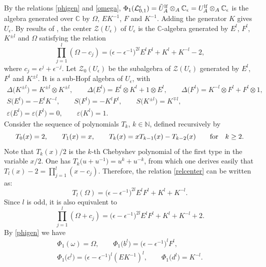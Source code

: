 \documentclass[pdftex]{sigma}%
\numberwithin{equation}{section}
\numberwithin{figure}{section}
\newcommand{\e}{\epsilon}
\newcommand{\mc}{\mathbb{C}}
\newcommand{\Ll}{{\mathcal L}}
\begin{document}
By the relations \eqref{phigen} and \eqref{omega}, $\Phi_1(\Ll_{0,1}^\e) = \tilde{U}_A^{\rm lf}\otimes_A {\mathbb C}_{\epsilon} = U_A^{\rm lf}\otimes_A {\mathbb C}_{\epsilon}$ is the algebra generated over $\mc$ by $\Omega$, $EK^{-1}$, $F$ and $K^{-1}$. Adding the generator $K$ gives $U_\epsilon$. By results of \cite{DC-K}, the center $\mathcal{Z}(U_\epsilon)$ of $U_\epsilon$ is the $\mc$-algebra generated by $E^l$, $F^l$, $K^{\pm l}$ and $\Omega$ satisfying the relation
 \begin{equation}\label{relcenter}
 \prod_{j=1}^l (\Omega- c_j) = \big(\epsilon-\epsilon^{-1}\big)^{2l}E^lF^l+K^l+K^{-l}- 2,
 \end{equation}
 where $ c_j = \epsilon^j+\epsilon^{-j}$. Let $\mathcal{Z}_0(U_\epsilon)$ be the subalgebra of $\mathcal{Z}(U_\epsilon)$ generated by $E^l$, $F^l$ and $K^{\pm l}$. It is a sub-Hopf algebra of $U_\epsilon$, with
\begin{gather*}
\Delta\big(K^{\pm l}\big)=K^{\pm l}\otimes K^{\pm l},\qquad
\Delta\big(E^l\big)=E^l\otimes K^l+1\otimes E^l,\qquad
\Delta\big(F^l\big)=K^{-l}\otimes F^l + F^l\otimes 1,
\\
S\big(E^l\big) = -E^lK^{-l},\qquad
S\big(F^l\big) = -K^lF^l,\qquad
S\big(K^{\pm l}\big) = K^{\mp l},
\\
\varepsilon\big(E^l\big) = \varepsilon\big(F^l\big)=0,\qquad
\varepsilon\big(K^l\big)=1.
\end{gather*}
Consider the sequence of polynomials $T_k$, $k\in \mathbb{N}$, defined recursively by
\begin{equation}\label{ChPol}
T_0(x)=2,\qquad
T_1(x) =x,\qquad
T_k(x) = xT_{k-1}(x)-T_{k-2}(x)\qquad
{\rm for}\quad k\geq 2.
\end{equation}
Note that $T_k(x)/2$ is the $k$-th Chebyshev polynomial of the first type in the variable $x/2$. One has $T_k\big(u+u^{-1}\big) = u^k+u^{-k}$, from which one derives easily that $\textstyle T_l(x) -2 = \prod_{j=1}^l (x-c_j)$.
Therefore, the relation \eqref{relcenter} can be written as:
\begin{equation}\label{relcenter3}
T_l(\Omega) = \big(\epsilon-\epsilon^{-1}\big)^{2l}E^lF^l+K^l+K^{-l}.
 \end{equation}
Since $l$ is odd, it is also equivalent to
\begin{equation}\label{relcenter2}
 \prod_{j=1}^l (\Omega+ c_j) = \big(\epsilon-\epsilon^{-1}\big)^{2l}E^lF^l+K^l+K^{-l}+2.
 \end{equation}
By \eqref{phigen} we have
 \begin{gather}
 \Phi_1(\omega)=\Omega, \qquad
 \Phi_1\big(b^l\big) = \big(\epsilon-\epsilon^{-1}\big)^l F^{l}, \nonumber\\
 \Phi_1\big(c^{l}\big) = \big(\epsilon-\epsilon^{-1}\big)^l (EK^{-1})^l, \qquad
 \Phi_1\big(d^{l}\big) = K^{-l}.\label{genroot}
 \end{gather}
\end{document}

